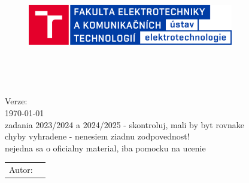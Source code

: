 

\begin{titlepage}

	\begin{center}
		\vspace{-1.5cm}
		
		\begin{figure}[!h]
			\centering
			\includegraphics[width=0.8\textwidth]{images/UETE_Color_RGB_CZ.png}
		\end{figure}
		
		\vspace{4cm}
	
		\LARGE{\textbf{\predmet}}\\
		\vspace{1cm}

		\textbf{\dokument}\\
		\vspace{0.5cm}

		\large{Verze: \verze} \\
		
		\color{red}
		\today \\
		zadania 2023/2024 a 2024/2025 - skontroluj, mali by byt rovnake \\
		chyby vyhradene - nenesiem ziadnu zodpovednost! \\
		nejedna sa o oficialny material, iba pomocku na ucenie
		\color{black}
		
		\vfill

		\Large\begin{tabular}{ll}
			Autor:      & \autor     \\
		\end{tabular}
		\hfill
	\end{center}
\end{titlepage}